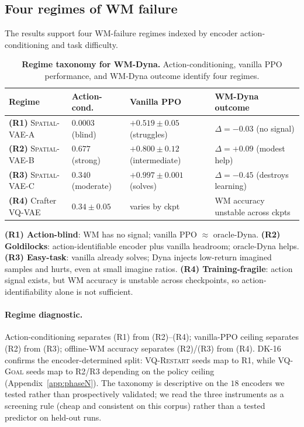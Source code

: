 \documentclass{article}
\newcommand{\encVQRestart}{\textsc{VQ-Restart}}
\newcommand{\encVQGoal}{\textsc{VQ-Goal}}
\newcommand{\srcVA}{\textsc{Spatial-VAE-A}}
\newcommand{\srcVB}{\textsc{Spatial-VAE-B}}
\newcommand{\srcVC}{\textsc{Spatial-VAE-C}}
\begin{document}
\subsection{Four regimes of WM failure}\label{sec:regimes}

The results support four WM-failure regimes indexed by encoder action-conditioning and task difficulty.

\begin{table}[t]
  \centering
  \small
  \caption{\textbf{Regime taxonomy for WM-Dyna.} Action-conditioning, vanilla PPO performance, and WM-Dyna outcome identify four regimes.}
  \label{tab:regime-summary}
  \setlength{\tabcolsep}{6pt}
  \begin{tabularx}{\textwidth}{@{}L{0.18\textwidth}L{0.16\textwidth}L{0.24\textwidth}X@{}}
    \toprule
    Regime & Action-cond.\ & Vanilla PPO & WM-Dyna outcome \\
    \midrule
    \textbf{(R1)} \srcVA{} & $0.0003$ (blind) & $+0.519 \pm 0.05$ (struggles) & $\Delta = -0.03$ (no signal) \\
    \textbf{(R2)} \srcVB{} & $0.677$ (strong) & $+0.800 \pm 0.12$ (intermediate) & $\Delta = +0.09$ (modest help) \\
    \textbf{(R3)} \srcVC{} & $0.340$ (moderate) & $+0.997 \pm 0.001$ (solves) & $\Delta = -0.45$ (destroys learning) \\
    \textbf{(R4)} Crafter VQ-VAE & $0.34 \pm 0.05$ & varies by ckpt & WM accuracy unstable across ckpts \\
    \bottomrule
  \end{tabularx}
\end{table}

\textbf{(R1) Action-blind}: WM has no signal; vanilla PPO $\approx$ oracle-Dyna. \textbf{(R2) Goldilocks}: action-identifiable encoder plus vanilla headroom; oracle-Dyna helps. \textbf{(R3) Easy-task}: vanilla already solves; Dyna injects low-return imagined samples and hurts, even at small imagine ratios. \textbf{(R4) Training-fragile}: action signal exists, but WM accuracy is unstable across checkpoints, so action-identifiability alone is not sufficient.

\paragraph{Regime diagnostic.} Action-conditioning separates (R1) from (R2)--(R4); vanilla-PPO ceiling separates (R2) from (R3); offline-WM accuracy separates (R2)/(R3) from (R4). DK-16 confirms the encoder-determined split: \encVQRestart{} seeds map to R1, while \encVQGoal{} seeds map to R2/R3 depending on the policy ceiling (Appendix~\ref{app:phaseN}). The taxonomy is descriptive on the $18$ encoders we tested rather than prospectively validated; we read the three instruments as a screening rule (cheap and consistent on this corpus) rather than a tested predictor on held-out runs.
\end{document}
